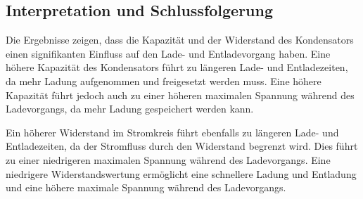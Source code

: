 \documentclass{article}
\begin{document}
\begin{multicols}{2}



\section{Interpretation und Schlussfolgerung}
Die Ergebnisse zeigen, dass die Kapazität und der Widerstand des Kondensators
einen signifikanten Einfluss auf den Lade- und Entladevorgang haben. Eine
höhere Kapazität des Kondensators führt zu längeren Lade- und Entladezeiten, da
mehr Ladung aufgenommen und freigesetzt werden muss. Eine höhere Kapazität
führt jedoch auch zu einer höheren maximalen Spannung während des Ladevorgangs,
da mehr Ladung gespeichert werden kann.

Ein höherer Widerstand im Stromkreis führt ebenfalls zu längeren Lade- und
Entladezeiten, da der Stromfluss durch den Widerstand begrenzt wird. Dies führt
zu einer niedrigeren maximalen Spannung während des Ladevorgangs. Eine
niedrigere Widerstandswertung ermöglicht eine schnellere Ladung und Entladung
und eine höhere maximale Spannung während des Ladevorgangs.

\end{multicols}
\end{document}
